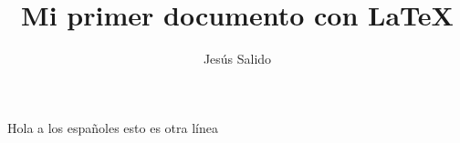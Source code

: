 \documentclass[11pt,a4paper]{article}
\author{Jesús Salido}
\title{Mi primer documento con LaTeX}
\begin{document}
Hola a     los    españoles   esto es otra línea
\end{document}
